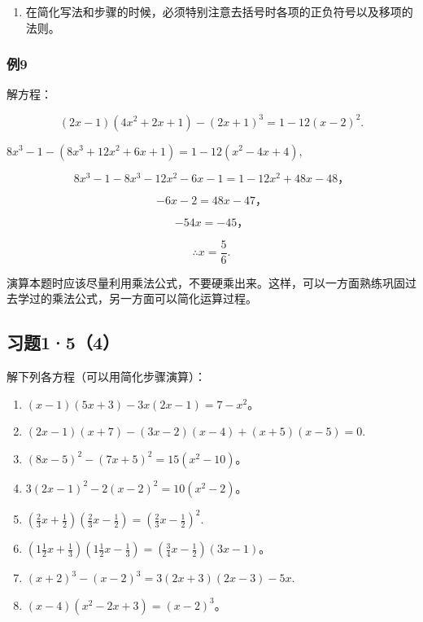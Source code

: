\begin{enumerate}[start=2]
\item
  在简化写法和步骤的时候，必须特别注意去括号时各项的正负符号以及移项的法则。
\end{enumerate}

\subsubsection{例9}

解方程：

\[
(2 x - 1) (4 x ^ {2} + 2 x + 1) - (2 x + 1) ^ {3} = 1 - 12 (x - 2) ^ {2}.
\]

\(8x^{3} - 1 - (8x^{3} + 12x^{2} + 6x + 1) = 1 - 12(x^{2} - 4x + 4),\)

\[
8 x ^ {3} - 1 - 8 x ^ {3} - 12 x ^ {2} - 6 x - 1 = 1 - 12 x ^ {2} + 48 x - 48\text{，}
\]

\[
- 6 x - 2 = 48 x - 47\text{，}
\]

\[
- 54 x = - 45\text{，}
\]

\[
\therefore x = \frac{5}{6}.
\]

演算本题时应该尽量利用乘法公式，不要硬乘出来。这样，可以一方面熟练巩固过去学过的乘法公式，另一方面可以简化运算过程。

\subsection{习题1·5（4）}

解下列各方程（可以用简化步骤演算）：

\begin{enumerate}[start=1]
\item
  \((x - 1)(5x + 3) - 3x(2x - 1) = 7 - x^2\)。
\item
  \((2x - 1)(x + 7) - (3x - 2)(x - 4) + (x + 5)(x - 5) = 0.\)
\item
  \((8x - 5)^{2} - (7x + 5)^{2} = 15(x^{2} - 10)\)。
\item
  \(3(2x - 1)^{2} - 2(x - 2)^{2} = 10(x^{2} - 2)\)。
\item
  \(\left(\frac{2}{3} x + \frac{1}{2}\right)\left(\frac{2}{3} x - \frac{1}{2}\right) = \left(\frac{2}{3} x - \frac{1}{2}\right)^2.\)
\item
  \(\left(1\frac{1}{2} x + \frac{1}{3}\right)\left(1\frac{1}{2} x - \frac{1}{3}\right) = \left(\frac{3}{4} x - \frac{1}{2}\right)(3x - 1)\)。
\item
  \((x + 2)^{3} - (x - 2)^{3} = 3(2x + 3)(2x - 3) - 5x.\)
\item
  \((x - 4)(x^2 - 2x + 3) = (x - 2)^3\)。
\end{enumerate}


